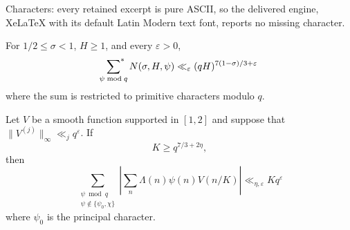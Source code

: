 \documentclass[10pt,a4paper]{amsart}
\newcommand{\eps}{\varepsilon}
\newcommand{\geqs}{\geqslant }
\newcommand{\leqs}{\leqslant }
\begin{document}
Characters: every retained excerpt is pure ASCII, so the delivered engine, XeLaTeX with its default Latin Modern text font, reports no missing character.
\begin{prop}
\label{prop:density}
For $1/2\leqs\sigma<1$, $H\geqs1$, and every $\eps>0$,
\begin{equation}
 \sideset{}{^*}\sum_{\psi\bmod q}N(\sigma,H,\psi)
 \ll_{\eps}
 (qH)^{7(1-\sigma)/3+\eps}
 \label{eq:density}
\end{equation}
where the sum is restricted to primitive characters modulo $q$.
\end{prop}

\begin{lem}
\label{lem:prime-L1}
Let $V$ be a
smooth function supported in $[1,2]$ and suppose that
$\|V^{(j)}\|_\infty\ll_j q^{\eps}$.  If
\begin{equation*}
 K\geqs q^{7/3+2\eta},
\end{equation*}
then
\begin{equation*}
 \sum_{\substack{\psi\bmod q\\\psi\notin\{\psi_0,\chi\}}}
 \left|\sum_n\Lambda(n)\psi(n)V(n/K)\right|
 \ll_{\eta,\eps}Kq^\eps
\end{equation*}
where $\psi_0$ is the principal character. 

\end{lem}
\end{document}
